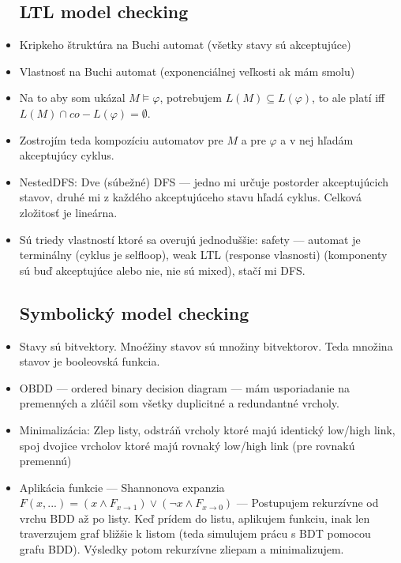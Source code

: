 \documentclass[paper=a4, fontsize=11pt]{scrartcl} %
\numberwithin{equation}{section} %
\numberwithin{figure}{section} %
\numberwithin{table}{section} %
\begin{document}
\begin{itemize}
	\subsection{LTL model checking}
	
	\item Kripkeho štruktúra na Buchi automat (všetky stavy sú akceptujúce)
	
	\item Vlastnosť na Buchi automat (exponenciálnej veľkosti ak mám smolu)
	
	\item Na to aby som ukázal $M \models \varphi$, potrebujem $L(M) \subseteq L(\varphi)$, to ale platí iff $L(M) \cap co-L(\varphi) = \emptyset$.
	
	\item Zostrojím teda kompozíciu automatov pre $M$ a pre $\varphi$ a v nej hľadám akceptujúcy cyklus.
	
	\item NestedDFS: Dve (súbežné) DFS — jedno mi určuje postorder akceptujúcich stavov, druhé mi z každého akceptujúceho stavu hľadá cyklus. Celková zložitosť je lineárna.
	
	\item Sú triedy vlastností ktoré sa overujú jednoduššie: safety — automat je terminálny (cyklus je selfloop), weak LTL (response vlasnosti) (komponenty sú buď akceptujúce alebo nie, nie sú mixed), stačí mi DFS.
	
	\subsection{Symbolický model checking}
	
	\item Stavy sú bitvektory. Mnoéžiny stavov sú množiny bitvektorov. Teda množina stavov je booleovská funkcia.
	
	\item OBDD — ordered binary decision diagram — mám usporiadanie na premenných a zlúčil som všetky duplicitné a redundantné vrcholy.
	
	\item Minimalizácia: Zlep listy, odstráň vrcholy ktoré majú identický low/high link, spoj dvojice vrcholov ktoré majú rovnaký low/high link (pre rovnakú premennú)
	
	\item Aplikácia funkcie — Shannonova expanzia $F(x, ...) = (x \land F_{x \to 1}) \lor (\neg x \land F_{x \to 0})$ — Postupujem rekurzívne od vrchu BDD až po listy. Keď prídem do listu, aplikujem funkciu, inak len traverzujem graf bližšie k listom (teda simulujem prácu s BDT pomocou grafu BDD). Výsledky potom rekurzívne zliepam a minimalizujem.
	

\end{itemize}
\end{document}
